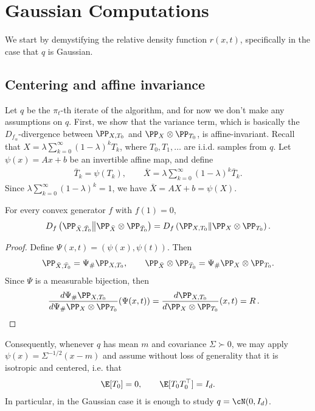 \newpage
\section{Gaussian Computations}
We start by demystifying the relative density function $r(x,t)$, specifically in the case that $q$ is Gaussian.

\subsection{Centering and affine invariance}
Let $q$ be the $\pi_t$-th iterate of the algorithm, and for now we don't make any assumptions on $q$.
First, we show that the variance term, which is basically the $D_{f_\alpha}$-divergence between $\PP_{X,T_0}$ and $\PP_X \otimes \PP_{T_0}$, is affine-invariant.
Recall that $X=\lambda\sum_{k=0}^{\infty}(1-\lambda)^kT_k$, where $T_0,T_1,\ldots$ are i.i.d. samples from $q$.
Let $\psi(x)=Ax+b$ be an invertible affine map, and define
\begin{align}
    \bar T_k=\psi(T_k),
    \qquad
    \bar X=\lambda\sum_{k=0}^{\infty}(1-\lambda)^k\bar T_k .
\end{align}
Since $\lambda\sum_{k=0}^{\infty}(1-\lambda)^k=1$, we have
$
    \bar X
    =
    A X+b
    =
    \psi(X)
$.

\begin{proposition}
    \label{prop:affine_invariance_f_divergence}
    For every convex generator $f$ with $f(1)=0$,
    \begin{align}
        D_f
        \left(
        \PP_{\bar X,\bar T_0}
        \middle\|
        \PP_{\bar X}\otimes \PP_{\bar T_0}
        \right)
        =
        D_f
        \left(
        \PP_{X,T_0}
        \middle\|
        \PP_X\otimes \PP_{T_0}
        \right).
    \end{align}
\end{proposition}
\begin{proof}
    Define $\Psi(x,t)=(\psi(x),\psi(t))$. Then
    \begin{align}
        \PP_{\bar X,\bar T_0}=\Psi_{\#}\PP_{X,T_0},
        \qquad
        \PP_{\bar X}\otimes \PP_{\bar T_0}=\Psi_{\#}\PP_X \otimes \PP_{T_0} .
    \end{align}
    Since $\Psi$ is a measurable bijection, then
    \begin{align}
        \frac{d\Psi_{\#}\PP_{X,T_0}}{d\Psi_{\#}\PP_X \otimes \PP_{T_0}}(\Psi(x,t))
        =
        \frac{d\PP_{X,T_0}}{d\PP_X \otimes \PP_{T_0}}(x,t)
         & =
        R\,.\qedhere
    \end{align}
\end{proof}
Consequently, whenever $q$ has mean $m$ and covariance $\Sigma\succ0$, we may apply
$\psi(x)=\Sigma^{-1/2}(x-m)$ and assume without loss of generality that it is isotropic and centered, i.e. that
\begin{align}
    \E[T_0]=0,
    \qquad
    \E[T_0T_0^\top]=I_d .
\end{align}
In particular, in the Gaussian case it is enough to study $q=\cN(0,I_d)$.


